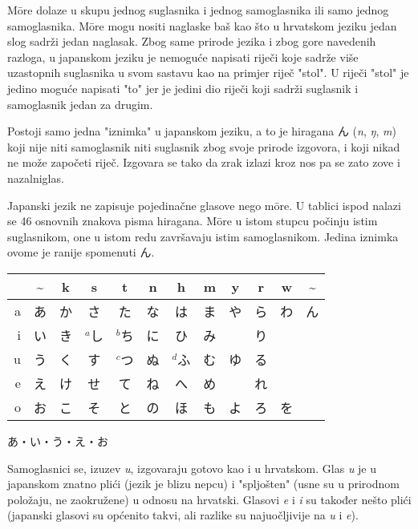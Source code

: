 	M\={o}re dolaze u skupu jednog suglasnika i jednog samoglasnika ili samo jednog samoglasnika. M\={o}re mogu nositi naglaske baš kao što u hrvatskom jeziku jedan slog sadrži jedan naglasak. Zbog same prirode jezika i zbog gore navedenih razloga, u japanskom jeziku je nemoguće napisati riječi koje sadrže više uzastopnih suglasnika u svom sastavu kao na primjer riječ "stol". U riječi "stol" je jedino moguće napisati "to" jer je jedini dio riječi koji sadrži suglasnik i samoglasnik jedan za drugim.
	
	Postoji samo jedna "iznimka" u japanskom jeziku, a to je hiragana ん (\textit{n}, \textit{ŋ}, \textit{m}) koji nije niti samoglasnik niti suglasnik zbog svoje prirode izgovora, i koji nikad ne može započeti riječ. Izgovara se tako da zrak izlazi kroz nos pa se zato zove i nazalni\footnotemark[1] glas.
	
	
	
	Japanski jezik ne zapisuje pojedinačne glasove nego m\={o}re. U tablici ispod nalazi se 46 osnovnih znakova pisma hiragana. M\={o}re u istom stupcu počinju istim suglasnikom, one u istom redu završavaju istim samoglasnikom. Jedina iznimka ovome je ranije spomenuti ん.
	
	\setlength{\tabcolsep}{10pt}
	\vspace{10pt}
	\begin{tabular}{|r|c|c|c|c|c|c|c|c|c|c|c|}
		\hline
		&\textasciitilde&k&s&t&n&h&m&y&r&w&\textasciitilde\\
		\hline
		a&あ&か&さ&た&な&は&ま&や&ら&わ&ん\\
		i&い&き&$^a$し&$^b$ち&に&ひ&み&&り&&\\
		u&う&く&す&$^c$つ&ぬ&$^d$ふ&む&ゆ&る&&\\
		e&え&け&せ&て&ね&へ&め&&れ&&\\
		o&お&こ&そ&と&の&ほ&も&よ&ろ&を&\\
		\hline
	\end{tabular}
	\setlength{\tabcolsep}{6pt}
	
	
	\noindent\ten あ・い・う・え・お
	
	Samoglasnici se, izuzev \textit{u}, izgovaraju gotovo kao i u hrvatskom. Glas \textit{u} je u japanskom znatno plići (jezik je blizu nepcu) i "spljošten" (usne su u prirodnom položaju, ne zaokružene) u odnosu na hrvatski. Glasovi \textit{e} i \textit{i} su također nešto plići (japanski glasovi su općenito takvi, ali razlike su najuočljivije na \textit{u} i \textit{e}).
	
